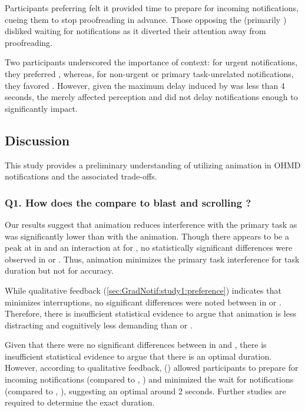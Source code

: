 Participants preferring \fading{} felt it provided time to prepare for incoming notifications, cueing them to stop proofreading in advance. Those opposing the \fading{} (primarily \slowfade{}) disliked waiting for notifications as it diverted their attention away from proofreading.

Two participants underscored the importance of context: for urgent notifications, they preferred \scroll{}, whereas, for non-urgent or primary task-unrelated notifications, they favored \fading{}. However, given the maximum delay induced by \fading{} was less than 4 seconds, the \animation{} merely affected perception and did not delay notifications enough to significantly impact.





\subsection{Discussion} 
\label{sec:GradNotif:study1:discussion}
 
This study provides a preliminary understanding of utilizing \fading{} animation in OHMD notifications and the associated trade-offs. 

\subsubsection*{Q1. How does the \fading{} \animation{} compare to blast and scrolling ?}

Our results suggest that \fading{} animation reduces interference with the primary task as \readingTime{} was significantly lower than with the \scroll{} animation. Though there appears to be a peak at \fastfade{} in \readingAccuracy{} and an interaction at \fastfade{} for \adjustedReadingAccuracy{}, no statistically significant differences were observed in \readingAccuracy{} or \adjustedReadingAccuracy{}. Thus, \fading{} animation minimizes the primary task interference for task duration but not for accuracy.

While qualitative feedback (\autoref{sec:GradNotif:study1:preference}) indicates that \fading{} minimizes interruptions, no significant differences were noted between  in \perceivedInterruption{} or \perceivedTaskLoad{}. Therefore, there is insufficient statistical evidence to argue that \fading{} animation is less distracting and cognitively less demanding than \instant{} or \scroll{}.

Given that there were no significant differences between  in \adjustedReadingAccuracy{} and \notificationAccuracy{}, there is insufficient statistical evidence to argue that there is an optimal \fading{} duration. However, according to qualitative feedback,  (\fastfade{}) allowed participants to prepare for incoming notifications (compared to , \instant{}) and minimized the wait for notifications (compared to , \slowfade{}), suggesting an optimal \fadeduration{} around 2 seconds. Further studies are required to determine the exact duration.

